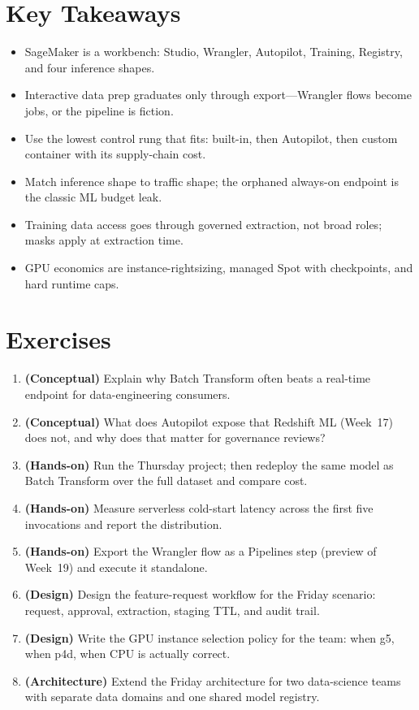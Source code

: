 \section*{Key Takeaways}
\begin{itemize}
    \item SageMaker is a workbench: Studio, Wrangler, Autopilot, Training, Registry, and four inference shapes.
    \item Interactive data prep graduates only through export---Wrangler flows become jobs, or the pipeline is fiction.
    \item Use the lowest control rung that fits: built-in, then Autopilot, then custom container with its supply-chain cost.
    \item Match inference shape to traffic shape; the orphaned always-on endpoint is the classic ML budget leak.
    \item Training data access goes through governed extraction, not broad roles; masks apply at extraction time.
    \item GPU economics are instance-rightsizing, managed Spot with checkpoints, and hard runtime caps.
\end{itemize}

\section{Exercises}
\begin{enumerate}
    \item \textbf{(Conceptual)} Explain why Batch Transform often beats a real-time endpoint for data-engineering consumers.
    \item \textbf{(Conceptual)} What does Autopilot expose that Redshift ML (Week~17) does not, and why does that matter for governance reviews?
    \item \textbf{(Hands-on)} Run the Thursday project; then redeploy the same model as Batch Transform over the full dataset and compare cost.
    \item \textbf{(Hands-on)} Measure serverless cold-start latency across the first five invocations and report the distribution.
    \item \textbf{(Hands-on)} Export the Wrangler flow as a Pipelines step (preview of Week~19) and execute it standalone.
    \item \textbf{(Design)} Design the feature-request workflow for the Friday scenario: request, approval, extraction, staging TTL, and audit trail.
    \item \textbf{(Design)} Write the GPU instance selection policy for the team: when g5, when p4d, when CPU is actually correct.
    \item \textbf{(Architecture)} Extend the Friday architecture for two data-science teams with separate data domains and one shared model registry.
\end{enumerate}

